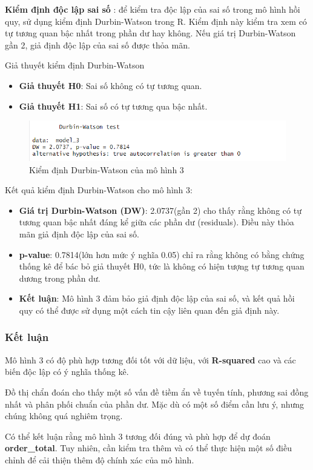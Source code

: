 \textbf{Kiểm định độc lập sai số} : để kiểm tra độc lập của sai số trong mô hình hồi quy, sử dụng kiểm định Durbin-Watson trong R. Kiểm định này kiểm tra xem có tự tương quan bậc nhất trong phần dư hay không. Nếu giá trị Durbin-Watson gần 2, giả định độc lập của sai số được thỏa mãn.

Giả thuyết kiểm định Durbin-Watson
\begin{itemize}
  \item\textbf{Giả thuyết H0}: Sai số không có tự tương quan.
  \item\textbf{Giả thuyết H1}: Sai số có tự tương qua bậc nhất.
\end{itemize}

\begin{figure}[H]
  \centering
  \includegraphics[width=0.5\linewidth]{graphics/5.5.8.png}
  \caption{Kiểm định Durbin-Watson của mô hình 3 }
\end{figure}

Kết quả kiểm định Durbin-Watson cho mô hình 3:
\begin{itemize}
  \item\textbf{Giá trị Durbin-Watson (DW)}: 2.0737(gần 2) cho thấy rằng không có tự tương quan bậc nhất đáng kể giữa các phần dư (residuals). Điều này thỏa mãn giả định độc lập của sai số.
  \item \textbf{p-value}: 0.7814(lớn hơn mức ý nghĩa 0.05) chỉ ra rằng không có bằng chứng thống kê để bác bỏ giả thuyết H0, tức là không có hiện tượng tự tương quan dương trong phần dư.
  \item\textbf{Kết luận}:  Mô hình 3 đảm bảo giả định độc lập của sai số, và kết quả hồi quy có thể được sử dụng một cách tin cậy liên quan đến giả định này.
\end{itemize}

\subsubsection{Kết luận}

Mô hình 3 có độ phù hợp tương đối tốt với dữ liệu, với \textbf{R-squared} cao và các biến độc lập có ý nghĩa thống kê.

Đồ thị chẩn đoán cho thấy một số vấn đề tiềm ẩn về tuyến tính, phương sai đồng nhất và phân phối chuẩn của phần dư. Mặc dù có một số điểm cần lưu ý, nhưng chúng không quá nghiêm trọng.

Có thể kết luận rằng mô hình 3 tương đối đúng và phù hợp để dự đoán \textbf{order\_total}. Tuy nhiên, cần kiểm tra thêm và có thể thực hiện một số điều chỉnh để cải thiện thêm độ chính xác của mô hình.







